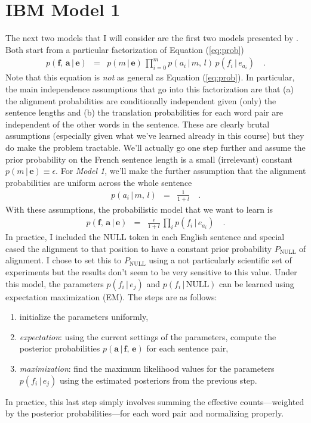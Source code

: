 \documentclass[11pt]{article}
\newcommand{\eq}[1]{Equation (\ref{eq:#1})}
\newcommand{\bvec}[1]{\ensuremath{\boldsymbol{#1}}}
\newcommand{\code}[1]{{\sffamily #1}}
\begin{document}
\section{IBM Model 1}

The next two models that I will consider are the first two models presented by
\citet{ibm}.
Both start from a particular factorization of \eq{prob}
\begin{eqnarray}
p(\bvec{f},\,\bvec{a}\,|\,\bvec{e}) &=&
    p(m\,|\,\bvec{e}) \, \prod_{i=0}^m p(a_i\,|\,m,\,l)\,p(f_i\,|\,e_{a_i})
    \quad.
\end{eqnarray}
Note that this equation is \emph{not} as general as \eq{prob}.
In particular, the main independence assumptions that go into this
factorization are that (a) the alignment probabilities are conditionally
independent given (only) the sentence lengths and (b) the translation
probabilities for each word pair are independent of the other words in the
sentence.
These are clearly brutal assumptions (especially given what we've learned
already in this course) but they do make the problem tractable.
We'll actually go one step further \citep[following][]{ibm} and assume the
prior probability on the French sentence length is a small (irrelevant)
constant $p(m\,|\,\bvec{e}) \equiv \epsilon$.
For \emph{Model 1}, we'll make the further assumption that the alignment
probabilities are uniform across the whole sentence
\begin{eqnarray}
p(a_i\,|\,m,\,l) &=& \frac{1}{1+l} \quad.
\end{eqnarray}
With these assumptions, the probabilistic model that we want to learn is
\begin{eqnarray}
p(\bvec{f},\,\bvec{a}\,|\,\bvec{e}) &=&
    \frac{\epsilon}{1+l}\,\prod_i p(f_i\,|\,e_{a_i}) \quad.
\end{eqnarray}
In practice, I included the \code{NULL} token in each English sentence and
special cased the alignment to that position to have a constant prior
probability $P_\mathrm{NULL}$ of alignment.
I chose to set this to $P_\mathrm{NULL}$ using a not particularly scientific
set of experiments but the results don't seem to be very sensitive to this
value.
Under this model, the parameters $p(f_i\,|\,e_j)$ and
$p(f_i\,|\,\mathrm{NULL})$ can be learned using expectation maximization (EM).
The steps are as follows:
\begin{enumerate}
\item{initialize the parameters uniformly,}
\item{\emph{expectation}: using the current settings of the parameters,
      compute the posterior probabilities
      $p(\bvec{a}\,|\,\bvec{f},\,\bvec{e})$ for each sentence pair,}
\item{\emph{maximization}: find the maximum likelihood values for the
      parameters $p(f_i\,|\,e_j)$ using the estimated posteriors
      from the previous step.}
\end{enumerate}
In practice, this last step simply involves summing the effective
counts---weighted by the posterior probabilities---for each word pair and
normalizing properly.
\end{document}
